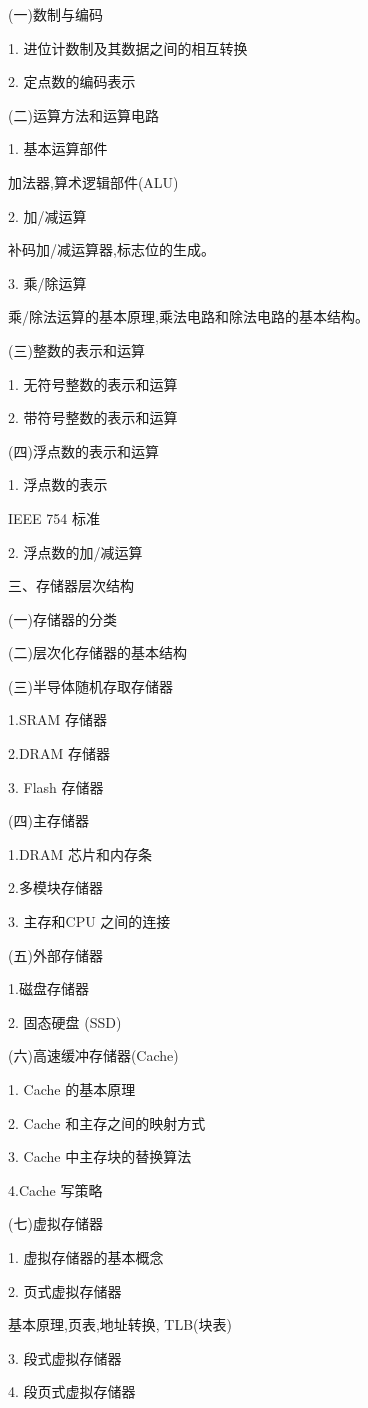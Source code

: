 \documentclass[10pt]{article}
\begin{document}
(一)数制与编码

1. 进位计数制及其数据之间的相互转换

2. 定点数的编码表示

(二)运算方法和运算电路

1. 基本运算部件

加法器,算术逻辑部件(ALU)

2. 加/减运算

补码加/减运算器,标志位的生成。

3. 乘/除运算

乘/除法运算的基本原理,乘法电路和除法电路的基本结构。

(三)整数的表示和运算

1. 无符号整数的表示和运算

2. 带符号整数的表示和运算

(四)浮点数的表示和运算

1. 浮点数的表示

IEEE 754 标准

2. 浮点数的加/减运算

三、存储器层次结构

(一)存储器的分类

(二)层次化存储器的基本结构

(三)半导体随机存取存储器

1.SRAM 存储器

2.DRAM 存储器

3. Flash 存储器

(四)主存储器

1.DRAM 芯片和内存条

2.多模块存储器

3. 主存和CPU 之间的连接

(五)外部存储器

1.磁盘存储器

2. 固态硬盘 (SSD)

(六)高速缓冲存储器(Cache)

1. Cache 的基本原理

2. Cache 和主存之间的映射方式

3. Cache 中主存块的替换算法

4.Cache 写策略

(七)虚拟存储器

1. 虚拟存储器的基本概念

2. 页式虚拟存储器

基本原理,页表,地址转换, TLB(块表)

3. 段式虚拟存储器

4. 段页式虚拟存储器
\end{document}
